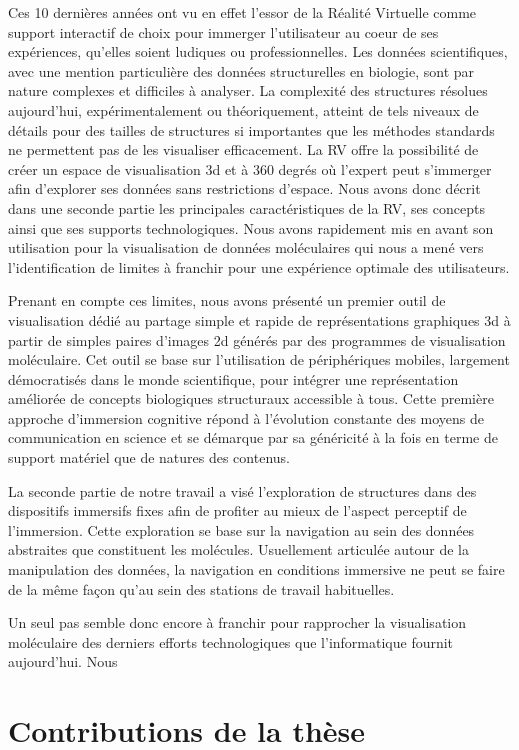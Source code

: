 Ces 10 dernières années ont vu en effet l'essor de la Réalité Virtuelle comme support interactif de choix pour immerger l'utilisateur au coeur de ses expériences, qu'elles soient ludiques ou professionnelles. Les données scientifiques, avec une mention particulière des données structurelles en biologie, sont par nature complexes et difficiles à analyser. La complexité des structures résolues aujourd'hui, expérimentalement ou théoriquement, atteint de tels niveaux de détails pour des tailles de structures si importantes que les méthodes standards ne permettent pas de les visualiser efficacement. La RV offre la possibilité de créer un espace de visualisation 3d et à 360 degrés où l'expert peut s'immerger afin d'explorer ses données sans restrictions d'espace. Nous avons donc décrit dans une seconde partie les principales caractéristiques de la RV, ses concepts ainsi que ses supports technologiques. Nous avons rapidement mis en avant son utilisation pour la visualisation de données moléculaires qui nous a mené vers l'identification de limites à franchir pour une expérience optimale des utilisateurs.

Prenant en compte ces limites, nous avons présenté un premier outil de visualisation dédié au partage simple et rapide de représentations graphiques 3d à partir de simples paires d'images 2d générés par des programmes de visualisation moléculaire. Cet outil se base sur l'utilisation de périphériques mobiles, largement démocratisés dans le monde scientifique, pour intégrer une représentation améliorée de concepts biologiques structuraux accessible à tous. Cette première approche d'immersion cognitive répond à l'évolution constante des moyens de communication en science et se démarque par sa généricité à la fois en terme de support matériel que de natures des contenus.

La seconde partie de notre travail a visé l'exploration de structures dans des dispositifs immersifs fixes afin de profiter au mieux de l'aspect perceptif de l'immersion. Cette exploration se base sur la navigation au sein des données abstraites que constituent les molécules. Usuellement articulée autour de la manipulation des données, la navigation en conditions immersive ne peut se faire de la même façon qu'au sein des stations de travail habituelles. 


Un seul pas semble donc encore à franchir pour rapprocher la visualisation moléculaire des derniers efforts technologiques que l'informatique fournit aujourd'hui. 
Nous 


\section*{Contributions de la thèse}


